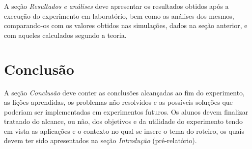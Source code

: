 \documentclass[10pt,twocolumn,letterpaper]{article}
\begin{document}
A seção {\em Resultados e análises} deve apresentar os resultados obtidos após a execução do experimento em laboratório, bem como as análises dos mesmos, comparando-os com os valores obtidos nas simulações, dados na seção anterior, e com aqueles calculados segundo a teoria.  

\section{Conclusão}

A seção {\em Conclusão} deve conter as conclusões alcançadas ao fim do experimento, as lições aprendidas, os problemas não resolvidos e as possíveis soluções que poderiam ser implementadas em experimentos futuros. Os alunos devem finalizar tratando do alcance, ou não, dos objetivos e da utilidade do experimento tendo em vista as aplicações e o contexto no qual se insere o tema do roteiro, os quais devem ter sido apresentados na seção {\em Introdução} (pré-relatório).

{\small


}
\end{document}
